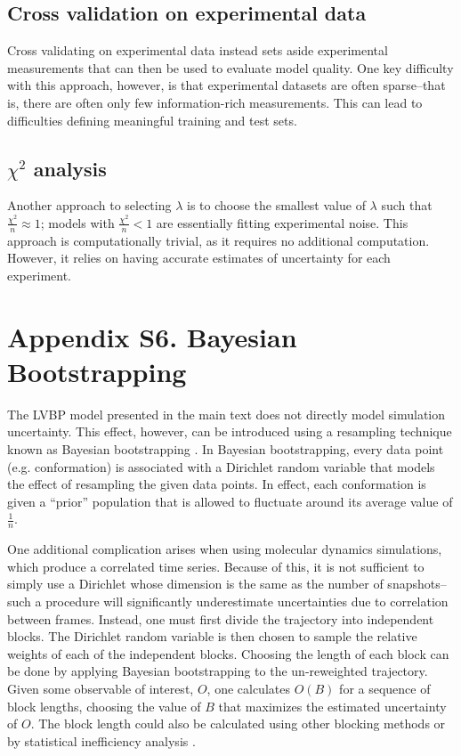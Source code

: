 \documentclass[journal=jacsat,manuscript=article]{achemso}
\begin{document}
\subsection{Cross validation on experimental data}

Cross validating on experimental data instead sets aside experimental measurements that can then be used to evaluate model quality.  One key difficulty with this approach, however, is that experimental datasets are often sparse--that is, there are often only few information-rich measurements.  This can lead to difficulties defining meaningful training and test sets.  

\subsection{$\chi^2$ analysis}

Another approach to selecting $\lambda$ is to choose the smallest value of $\lambda$ such that $\frac{\chi^2}{n} \approx 1$; models with $\frac{\chi^2}{n} < 1$ are essentially fitting experimental noise.  This approach is computationally trivial, as it requires no additional computation.  However, it relies on having accurate estimates of uncertainty for each experiment.  

\section{Appendix S6.  Bayesian Bootstrapping}

The LVBP model presented in the main text does not directly model simulation uncertainty.  This effect, however, can be introduced using a resampling technique known as Bayesian bootstrapping \cite{rubin1981}.  In Bayesian bootstrapping, every data point (e.g. conformation) is associated with a Dirichlet random variable that models the effect of resampling the given data points.  In effect, each conformation is given a ``prior'' population that is allowed to fluctuate around its average value of $\frac{1}{n}$.  

One additional complication arises when using molecular dynamics simulations, which produce a correlated time series.  Because of this, it is not sufficient to simply use a Dirichlet whose dimension is the same as the number of snapshots--such a procedure will significantly underestimate uncertainties due to correlation between frames.  Instead, one must first divide the trajectory into independent blocks.  The Dirichlet random variable is then chosen to sample the relative weights of each of the independent blocks.  Choosing the length of each block can be done by applying Bayesian bootstrapping to the un-reweighted trajectory.  Given some observable of interest, $O$, one calculates $O(B)$ for a sequence of block lengths, choosing the value of $B$ that maximizes the estimated uncertainty of $O$.  The block length could also be calculated using other blocking methods \cite{flyvbjerg1989error} or by statistical inefficiency analysis \cite{shirts2008}.  
\end{document}
